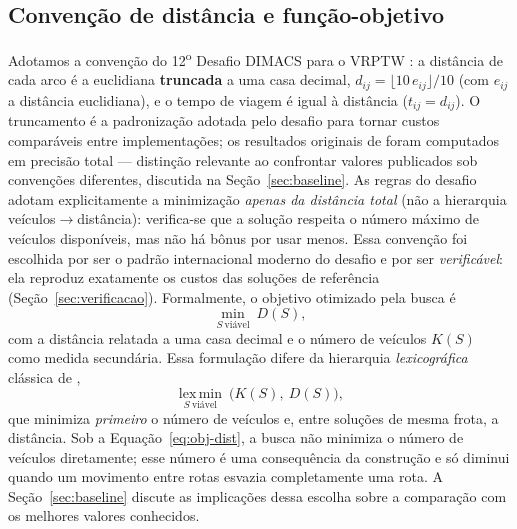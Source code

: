 \documentclass[12pt, a4paper]{article}
\begin{document}
\subsection{Convenção de distância e função-objetivo}\label{sec:objetivo}
Adotamos a convenção do 12\textsuperscript{o} Desafio DIMACS para o VRPTW \citep{dimacs12vrptw}: a distância de cada arco é a euclidiana \textbf{truncada} a uma casa decimal, $d_{ij}=\lfloor 10\,e_{ij}\rfloor/10$ (com $e_{ij}$ a distância euclidiana), e o tempo de viagem é igual à distância ($t_{ij}=d_{ij}$). O truncamento é a padronização adotada pelo desafio para tornar custos comparáveis entre implementações; os resultados originais de \citet{solomon1987algorithms} foram computados em precisão total --- distinção relevante ao confrontar valores publicados sob convenções diferentes, discutida na Seção~\ref{sec:baseline}. As regras do desafio adotam explicitamente a minimização \emph{apenas da distância total} (não a hierarquia veículos$\rightarrow$distância): verifica-se que a solução respeita o número máximo de veículos disponíveis, mas não há bônus por usar menos. Essa convenção foi escolhida por ser o padrão internacional moderno do desafio e por ser \emph{verificável}: ela reproduz exatamente os custos das soluções de referência (Seção~\ref{sec:verificacao}). Formalmente, o objetivo otimizado pela busca é
\begin{equation}
\min_{S\ \text{viável}}\ D(S),
\label{eq:obj-dist}
\end{equation}
com a distância relatada a uma casa decimal e o número de veículos $K(S)$ como medida secundária. Essa formulação difere da hierarquia \emph{lexicográfica} clássica de \citet{solomon1987algorithms},
\begin{equation}
\operatorname*{lex\,min}_{S\ \text{viável}}\ \big(K(S),\ D(S)\big),
\label{eq:obj-lex}
\end{equation}
que minimiza \emph{primeiro} o número de veículos e, entre soluções de mesma frota, a distância. Sob a Equação~\eqref{eq:obj-dist}, a busca não minimiza o número de veículos diretamente; esse número é uma consequência da construção e só diminui quando um movimento entre rotas esvazia completamente uma rota. A Seção~\ref{sec:baseline} discute as implicações dessa escolha sobre a comparação com os melhores valores conhecidos.
\end{document}
